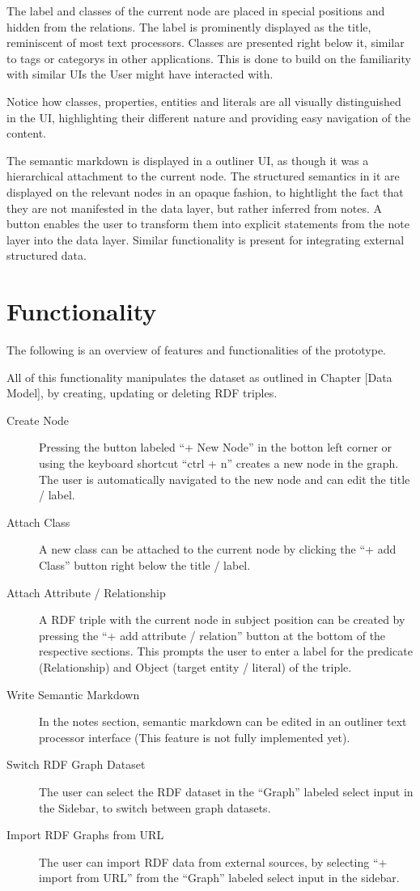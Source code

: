 The label and classes of the current node are placed in special positions and hidden from the relations. The label is prominently displayed as the title, reminiscent of most text processors. Classes are presented right below it, similar to tags or categorys in other applications. This is done to build on the familiarity with similar UIs the User might have interacted with.
    
Notice how classes, properties, entities and literals are all visually distinguished in the UI, highlighting their different nature and providing easy navigation of the content.

The semantic markdown is displayed in a outliner UI, as though it was a hierarchical attachment to the current node. The structured semantics in it are displayed on the relevant nodes in an opaque fashion, to hightlight the fact that they are not manifested in the data layer, but rather inferred from notes. A button enables the user to transform them into explicit statements from the note layer into the data layer. Similar functionality is present for integrating external structured data.

\section{Functionality}

The following is an overview of features and functionalities of the prototype.

All of this functionality manipulates the dataset as outlined in Chapter [Data Model], by creating, updating or deleting RDF triples.
\begin{description}
    \item[Create Node] Pressing the button labeled “+ New Node” in the botton left corner or using the keyboard shortcut “ctrl + n” creates a new node in the graph. The user is automatically navigated to the new node and can edit the title / label.
    \item[Attach Class] A new class can be attached to the current node by clicking the “+ add Class” button right below the title / label.
    \item[Attach Attribute / Relationship] A RDF triple with the current node in subject position can be created by pressing the “+ add attribute / relation” button at the bottom of the respective sections. This prompts the user to enter a label for the predicate (Relationship) and Object (target entity / literal) of the triple.
    \item[Write Semantic Markdown] In the notes section, semantic markdown can be edited in an outliner text processor interface (This feature is not fully implemented yet).
    \item[Switch RDF Graph Dataset] The user can select the RDF dataset in the “Graph” labeled select input in the Sidebar, to switch between graph datasets.
    \item[Import RDF Graphs from URL] The user can import RDF data from external sources, by selecting “+ import from URL” from the “Graph” labeled select input in the sidebar.
\end{description}

